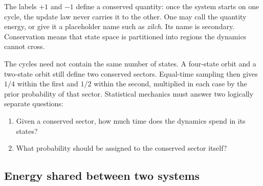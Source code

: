 The labels \(+1\) and \(-1\) define a conserved quantity: once the system
starts on one cycle, the update law never carries it to the other. One may
call the quantity energy, or give it a placeholder name such as
\emph{zilch}. Its name is secondary. Conservation means that state space is
partitioned into regions the dynamics cannot cross.

The cycles need not contain the same number of states. A four-state orbit and
a two-state orbit still define two conserved sectors. Equal-time sampling
then gives \(1/4\) within the first and \(1/2\) within the second, multiplied
in each case by the prior probability of that sector. Statistical mechanics
must answer two logically separate questions:
\begin{enumerate}
\item Given a conserved sector, how much time does the dynamics spend in its
states?
\item What probability should be assigned to the conserved sector itself?
\end{enumerate}

\begin{classroomqa}
\end{classroomqa}

\begin{classroomqa}
\end{classroomqa}

\subsection{Energy shared between two systems}

